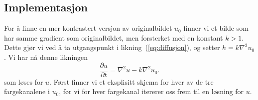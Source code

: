 \subsection{Implementasjon}
For å finne en mer kontrastert versjon av originalbildet $u_0$ finner vi et bilde som har samme gradient som originalbildet, men forsterket med en konstant $k>1$. Dette gjør vi ved å ta utgangspunkt i likning~(\ref{eq:diffusjon}), og setter $h = k \nabla^2 u_0$. Vi har nå denne likningen
\begin{equation}
\frac{\partial u}{\partial t} = \nabla^2 u - k \nabla^2 u_0.
\label{eq:contrast}
\end{equation}
som løses for $u$. Først finner vi et eksplisitt skjema for hver av de tre fargekanalene i  $u_0$, før vi for hver fargekanal itererer oss frem til en løsning for $u$.

